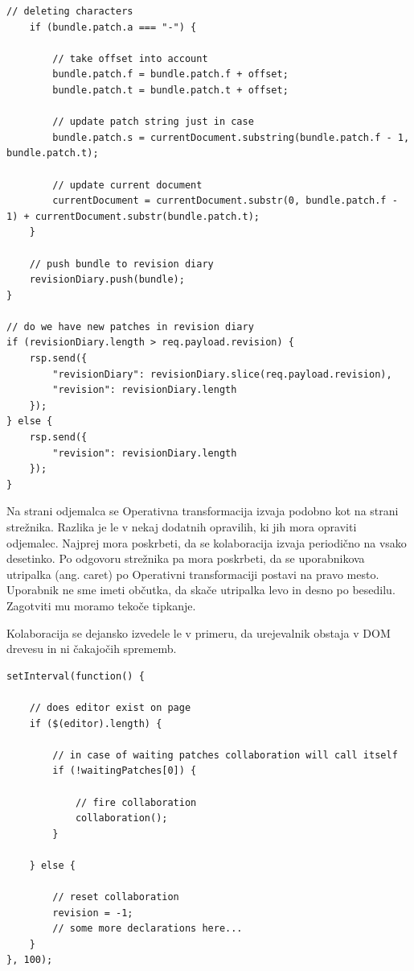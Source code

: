 \documentclass[a4paper, 12pt, twoside]{book}
\begin{document}
\begin{lstlisting}[title={Koda 6.3: Izvajanje Operativne transformacije na strani strežnika.}]
    // deleting characters
    if (bundle.patch.a === "-") {

        // take offset into account
        bundle.patch.f = bundle.patch.f + offset;
        bundle.patch.t = bundle.patch.t + offset;

        // update patch string just in case
        bundle.patch.s = currentDocument.substring(bundle.patch.f - 1, bundle.patch.t);

        // update current document
        currentDocument = currentDocument.substr(0, bundle.patch.f - 1) + currentDocument.substr(bundle.patch.t);
    }

    // push bundle to revision diary
    revisionDiary.push(bundle);
}

// do we have new patches in revision diary
if (revisionDiary.length > req.payload.revision) {
    rsp.send({
        "revisionDiary": revisionDiary.slice(req.payload.revision),
        "revision": revisionDiary.length
    });
} else {
    rsp.send({
        "revision": revisionDiary.length
    });
}
\end{lstlisting}

\pagebreak
Na strani odjemalca se Operativna transformacija izvaja podobno kot na strani strežnika. Razlika je le v nekaj dodatnih opravilih, ki jih mora opraviti odjemalec. Najprej mora poskrbeti, da se kolaboracija izvaja periodično na vsako desetinko. Po odgovoru strežnika pa mora poskrbeti, da se uporabnikova utripalka (ang. caret) po Operativni transformaciji postavi na pravo mesto. Uporabnik ne sme imeti občutka, da skače utripalka levo in desno po besedilu. Zagotviti mu moramo tekoče tipkanje.

Kolaboracija se dejansko izvedele le v primeru, da urejevalnik obstaja v DOM drevesu in ni čakajočih sprememb.\newline

\begin{lstlisting}[title={Koda 6.4: Periodično izvajanja kolaboracije.}]
setInterval(function() {

    // does editor exist on page
    if ($(editor).length) {

        // in case of waiting patches collaboration will call itself
        if (!waitingPatches[0]) {

            // fire collaboration
            collaboration();
        }
        
    } else {

        // reset collaboration
        revision = -1;
        // some more declarations here...
    }
}, 100);
\end{lstlisting}
\end{document}
